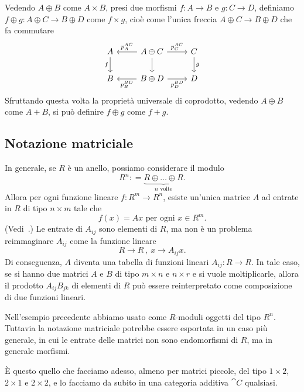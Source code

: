 Vedendo \(A \oplus B\) come \(A \times B\), presi due morfismi
\(f : A \to B\) e \(g : C \to D\), definiamo
\(f \oplus g : A \oplus C \to B \oplus D\) come \(f \times g\), cioè
come l'unica freccia \(A \oplus C \to B \oplus D\) che fa commutare
\[
  \begin{tikzcd}
    A \ar["{f}", d, swap] & A \oplus C \ar["{p_A^{AC}}", l, swap]
    \ar["{}", d] \ar["{p_C^{AC}}", r] & C \ar["{g}", d] \\
    B & B \oplus D \ar["{p_B^{BD}}", l] \ar["{p_D^{BD}}", r, swap] & D
  \end{tikzcd}
\]
Sfruttando questa volta la proprietà universale di coprodotto, vedendo
\(A \oplus B\) come \(A + B\), si può definire \(f \oplus g\) come
\(f + g\).


\subsection{Notazione matriciale}

\begin{example}
  In generale, se \(R\) è un anello, possiamo considerare il modulo
  \[
    R^n : = \underbrace{R \oplus \dots{} \oplus R}_{n \text{ volte}}.
  \]
  Allora per ogni funzione lineare \(f : R^m \to R^n\), esiste un'unica
  matrice \(A\) ad entrate in \(R\) di tipo \(n \times m\) tale che
  \[
    f(x) = A x \text{ per ogni } x \in R^m .
  \]
  (Vedi~\cite{aluffi:algebra}.) Le entrate di \(A_{ij}\) sono elementi
  di \(R\), ma non è un problema reimmaginare \(A_{ij}\) come la
  funzione lineare
  \[
    R \to R\,,\ x \to A_{ij}x .
  \]
  Di conseguenza, \(A\) diventa una tabella di funzioni lineari
  \(A_{ij} : R \to R\). In tale caso, se si hanno due matrici \(A\) e
  \(B\) di tipo \(m \times n\) e \(n \times r\) e si vuole
  moltiplicarle, allora il prodotto \(A_{ij} B_{jk}\) di elementi di
  \(R\) può essere reinterpretato come composizione di due funzioni
  lineari.
\end{example}

Nell'esempio precedente abbiamo usato come \(R\)-moduli oggetti del tipo
\(R^n\). Tuttavia la notazione matriciale potrebbe essere esportata in
un caso più generale, in cui le entrate delle matrici non sono
endomorfismi di \(R\), ma in generale morfismi.

È questo quello che facciamo adesso, almeno per matrici piccole, del
tipo \(1 \times 2\), \(2 \times 1\) e \(2 \times 2\), e lo facciamo da
subito in una categoria additiva \(\cat C\) qualsiasi.

